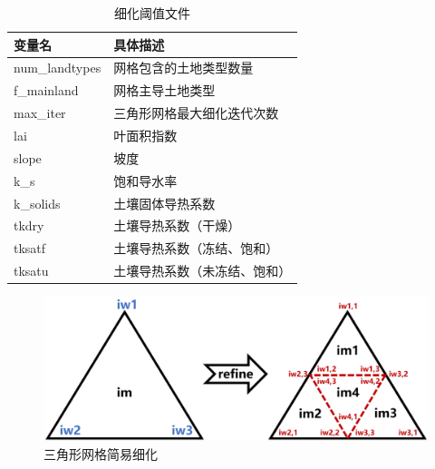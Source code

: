 {
  \begin{table}[htbp]
    \centering
    \caption{细化阈值文件}
    \label{tab:细化阈值文件}
    \begin{tabular}{@{}ll@{}}
      \toprule
      变量名         & 具体描述                     \\ \midrule
      num\_landtypes & 网格包含的土地类型数量       \\
      f\_mainland    & 网格主导土地类型             \\
      max\_iter      & 三角形网格最大细化迭代次数   \\
      lai            & 叶面积指数                   \\
      slope          & 坡度                         \\
      k\_s           & 饱和导水率                   \\
      k\_solids      & 土壤固体导热系数             \\
      tkdry          & 土壤导热系数（干燥）         \\
      tksatf         & 土壤导热系数（冻结、饱和）   \\
      tksatu         & 土壤导热系数（未冻结、饱和） \\ \bottomrule
    \end{tabular}
  \end{table}
}

{
  \begin{figure}[htbp]
    \centering
    \includegraphics[width=\textwidth]{Figures/模式构架/三角形网格简易细化.png}
    \caption{三角形网格简易细化}
    \label{fig:三角形网格简易细化}
  \end{figure}
}

